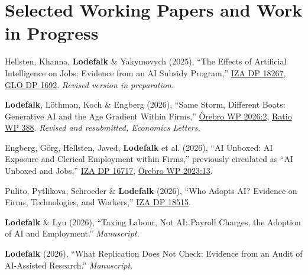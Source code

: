 \documentclass[11pt,a4paper]{article}
\newcommand{\name}[1]{\textbf{#1}}
\newcommand{\publication}[1]{\item #1}
\begin{document}
\section{Selected Working Papers and Work in Progress}
\vspace{-2pt}
\begin{enumerate}[label={[\arabic*]}]

\publication{Hellsten, Khanna, \name{Lodefalk} \& Yakymovych (2025), ``The Effects of Artificial Intelligence on Jobs: Evidence from an AI Subsidy Program,'' \href{https://www.iza.org/publications/dp/18267}{IZA DP 18267}, \href{https://ideas.repec.org/p/zbw/glodps/1692.html}{GLO DP 1692}. \textit{Revised version in preparation.}} %

\publication{\name{Lodefalk}, Löthman, Koch \& Engberg (2026), ``Same Storm, Different Boats: Generative AI and the Age Gradient Within Firms,'' \href{https://www.oru.se/globalassets/oru-sv/institutioner/hh/workingpapers/workingpapers2026/wp-2-2026.pdf}{Örebro WP 2026:2}, \href{https://cms.ratio.se/app/uploads/2026/03/lodefalk_march16_paper_v2-kombinerades.pdf}{Ratio WP 388}. \textit{Revised and resubmitted, Economics Letters.}} %

\publication{Engberg, Görg, Hellsten, Javed, \name{Lodefalk} et al. (2026), ``AI Unboxed: AI Exposure and Clerical Employment within Firms,'' previously circulated as ``AI Unboxed and Jobs,'' \href{https://www.iza.org/publications/dp/16717}{IZA DP 16717}, \href{https://www.oru.se/globalassets/oru-sv/institutioner/hh/workingpapers/workingpapers2023/wp-13-2023.pdf}{Örebro WP 2023:13}.} %

\publication{Pulito, Pytlikova, Schroeder \& \name{Lodefalk} (2026), ``Who Adopts AI? Evidence on Firms, Technologies, and Workers,'' \href{https://www.iza.org/publications/dp/18515}{IZA DP 18515}.}

\publication{\name{Lodefalk} \& Lyu (2026), ``Taxing Labour, Not AI: Payroll Charges, the Adoption of AI and Employment.'' \textit{Manuscript.}} %

\publication{\name{Lodefalk} (2026), ``What Replication Does Not Check: Evidence from an Audit of AI-Assisted Research.'' \textit{Manuscript.}} %


\end{enumerate}
\end{document}
